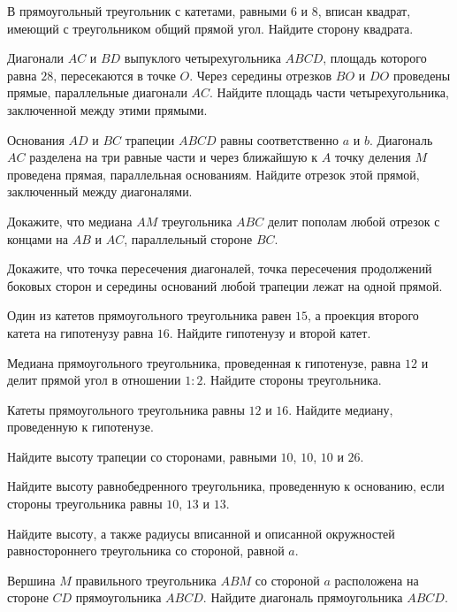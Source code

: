%
%

\begin{class}[number=1]
	\begin{listofex}
		\item В прямоугольный треугольник с катетами, равными \(6\) и 8, вписан квадрат, имеющий с треугольником общий прямой угол. Найдите сторону квадрата.
		\item Диагонали \(AC\) и \(BD \) выпуклого четырехугольника \(ABCD\), площадь которого равна \(28\), пересекаются в точке \(O\). Через середины отрезков \(BO\) и \(DO\) проведены прямые, параллельные диагонали \(AC\). Найдите площадь части четырехугольника, заключенной между этими прямыми.
		\item Основания \(AD\) и \(BC\) трапеции \(ABCD\) равны соответственно \(a\) и \(b\). Диагональ \(AC\) разделена на три равные части и через ближайшую к \(A\) точку деления \(M\) проведена прямая, параллельная основаниям. Найдите отрезок этой прямой, заключенный между диагоналями.
		\item Докажите, что медиана \(AM\) треугольника \(ABC\) делит пополам любой отрезок с концами на \(AB\) и \(AC\), параллельный стороне \(BC\). 
		\item Докажите, что точка пересечения диагоналей, точка пересечения продолжений боковых сторон и середины оснований любой трапеции лежат на одной прямой.
	\end{listofex}
\end{class}

\begin{class}[number=2]
	\begin{listofex}
		\item Один из катетов прямоугольного треугольника равен \( 15 \), а проекция второго катета на гипотенузу равна \( 16 \). Найдите гипотенузу и второй катет.
		\item Медиана прямоугольного треугольника, проведенная
		к гипотенузе, равна \( 12 \) и делит прямой угол в отношении \( 1:2 \). Найдите стороны треугольника.
		\item Катеты прямоугольного треугольника равны \( 12 \) и \( 16 \). Найдите медиану, проведенную к гипотенузе.
		\item Найдите высоту трапеции со сторонами, равными \( 10 \), \( 10 \), \( 10 \) и \( 26 \).
		\item Найдите высоту равнобедренного треугольника, проведенную к основанию, если стороны треугольника равны \( 10 \), \( 13 \) и \( 13 \).
		\item Найдите высоту, а также радиусы вписанной и описанной окружностей равностороннего треугольника со стороной, равной \( a \).
		\item Вершина \( M \) правильного треугольника \( ABM \) со стороной \( a \) расположена на стороне \( CD \) прямоугольника \( ABCD \).	Найдите диагональ прямоугольника \( ABCD \).
	\end{listofex}
\end{class}

